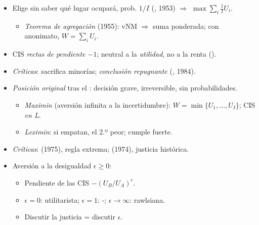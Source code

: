 \documentclass{article}
\begin{document}
\begin{columnas}
\begin{itemize}
\item Elige sin saber qué lugar ocupará, prob. $1/I$ (, 1953) $\Rightarrow$ $\max\sum_i\frac1IU_i$.
  \begin{itemize}
  \item \emph{Teorema de agregación} (1955): vNM  $\Rightarrow$ suma ponderada; con anonimato, $W=\sum_iU_i$.
  \end{itemize}
\item CIS \emph{rectas de pendiente $-1$}; neutral a la \emph{utilidad}, no a la renta ().
\item \emph{Críticas}: sacrifica minorías; \emph{conclusión repugnante} (, 1984).
\end{itemize}
\begin{itemize}
\item \emph{Posición original} tras el : decisión grave, irreversible, sin probabilidades.
  \begin{itemize}
  \item \emph{Maximin} (aversión infinita a la incertidumbre): $W=\min\{U_1,\dots,U_I\}$; CIS \emph{en L}.
  \item \emph{Leximin}: si empatan, el 2.º peor; cumple  fuerte.
  \end{itemize}
\item \emph{Críticas}:  (1975), regla extrema;  (1974), justicia histórica.
\end{itemize}
\begin{itemize}
\item Aversión a la desigualdad $\epsilon\geq0$:
  \begin{itemize}
  \item Pendiente de las CIS $-(U_B/U_A)^{\epsilon}$.
  \item $\epsilon=0$: utilitarista; $\epsilon=1$: -; $\epsilon\to\infty$: rawlsiana.
  \item Discutir la justicia = discutir $\epsilon$.
  \end{itemize}
\end{itemize}


\end{columnas}
\end{document}

